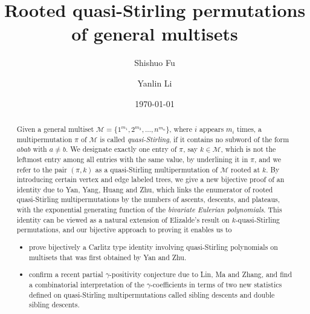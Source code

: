 \documentclass[11pt,reqno]{amsart}
\numberwithin{equation}{section}
\theoremstyle{plain}
\theoremstyle{definition}
\newcommand{\M}{\mathcal{M}}
\begin{document}
\title[Rooted quasi-Stirling permutations of general multisets]{Rooted quasi-Stirling permutations of general multisets}

\author[S. Fu]{Shishuo Fu}
\address[Shishuo Fu]{College of Mathematics and Statistics, Chongqing University, Huxi campus, Chongqing 401331, P.R. China}

\author[Y. Li]{Yanlin Li}
\address[Yanlin Li]{College of Mathematics and Statistics, Chongqing University, Huxi campus, Chongqing 401331, P.R. China}


\date{\today}


\begin{abstract}
Given a general multiset $\M=\{1^{m_1},2^{m_2},\ldots,n^{m_n}\}$, where $i$ appears $m_i$ times, a multipermutation $\pi$ of $\M$ is called {\em quasi-Stirling}, if it contains no subword of the form $abab$ with $a\neq b$. We designate exactly one entry of $\pi$, say $k\in \M$, which is not the leftmost entry among all entries with the same value, by underlining it in $\pi$, and we refer to the pair $(\pi,k)$ as a quasi-Stirling multipermutation of $\M$ rooted at $k$. By introducing certain vertex and edge labeled trees, we give a new bijective proof of an identity due to Yan, Yang, Huang and Zhu, which links the enumerator of rooted quasi-Stirling multipermutations by the numbers of ascents, descents, and plateaus, with the exponential generating function of the {\em bivariate Eulerian polynomials}. This identity can be viewed as a natural extension of Elizalde's result on $k$-quasi-Stirling permutations, and our bijective approach to proving it enables us to
\begin{itemize}
	\item prove bijectively a Carlitz type identity involving quasi-Stirling polynomials on multisets that was first obtained by Yan and Zhu.
	\item confirm a recent partial $\gamma$-positivity conjecture due to Lin, Ma and Zhang, and find a combinatorial interpretation of the $\gamma$-coefficients in terms of two new statistics defined on quasi-Stirling multipermutations called sibling descents and double sibling descents.
\end{itemize}
\end{abstract}


\keywords{}

\maketitle
\end{document}
